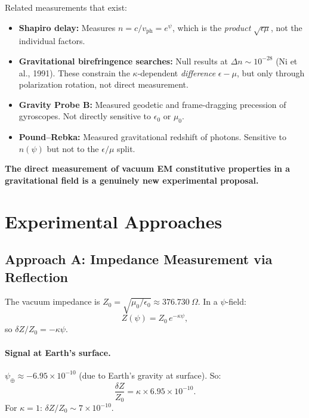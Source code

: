 \documentclass[11pt]{article}
\newcommand{\ee}[1]{\times 10^{#1}}
\begin{document}
Related measurements that exist:
\begin{itemize}[nosep]
\item \textbf{Shapiro delay:}  Measures $n = c/v_{\text{ph}} = e^\psi$,
  which is the \textit{product} $\sqrt{\epsilon\mu}$, not the
  individual factors.

\item \textbf{Gravitational birefringence searches:}  Null results
  at $\Delta n \sim 10^{-28}$ (Ni et al., 1991).  These constrain
  the $\kappa$-dependent \textit{difference} $\epsilon - \mu$, but
  only through polarization rotation, not direct measurement.

\item \textbf{Gravity Probe B:}  Measured geodetic and frame-dragging
  precession of gyroscopes.  Not directly sensitive to $\epsilon_0$
  or $\mu_0$.

\item \textbf{Pound--Rebka:}  Measured gravitational redshift of
  photons.  Sensitive to $n(\psi)$ but not to the $\epsilon/\mu$
  split.
\end{itemize}

\textbf{The direct measurement of vacuum EM constitutive properties
in a gravitational field is a genuinely new experimental proposal.}

\section{Experimental Approaches}
\label{sec:vacuum-em-approaches}

\subsection{Approach A: Impedance Measurement via Reflection}

The vacuum impedance is $Z_0 = \sqrt{\mu_0/\epsilon_0}
\approx 376.730~\Omega$.  In a $\psi$-field:
\begin{equation}
Z(\psi) = Z_0\, e^{-\kappa\psi},
\end{equation}
so $\delta Z/Z_0 = -\kappa\psi$.

\paragraph{Signal at Earth's surface.}
$\psi_\oplus \approx -6.95\ee{-10}$ (due to Earth's gravity at
surface).  So:
\begin{equation}
\frac{\delta Z}{Z_0} = \kappa \times 6.95\ee{-10}.
\end{equation}
For $\kappa = 1$: $\delta Z/Z_0 \sim 7\ee{-10}$.
\end{document}
